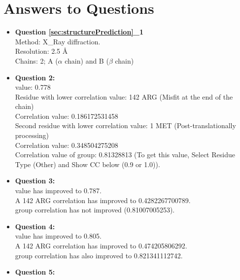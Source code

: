\section{Answers to Questions}
\label{app:solutions}

\begin{itemize}
 \item \textbf{Question \ref{sec:structurePrediction}\_1}\\
 
Method: X\_Ray diffraction.\\
Resolution: 2.5 \AA\\
Chains: 2; A ($\alpha$ chain) and B ($\beta$ chain)\\

 \item \textbf{Question 2:}\\
 
\ccmask value: 0.778\\
Residue with lower correlation value: 142 ARG (Misfit at the end of the chain)\\
Correlation value: 0.186172531458\\
Second residue with lower correlation value: 1 MET (Post-translationally processing)\\
Correlation value: 0.348504275208\\
Correlation value of  group: 0.81328813 (To get this value, Select Residue Type (Other) and Show CC below (0.9 or 1.0)).\\

 \item \textbf{Question 3:}\\
 
\ccmask value has improved to 0.787.\\
A 142 ARG correlation has improved to 0.4282267700789.\\
 group correlation has not improved (0.81007005253).\\

 \item \textbf{Question 4:}\\
 
 \ccmask value has improved to 0.805.\\
 A 142 ARG correlation has improved to 0.474205806292.\\
  group correlation has also improved to 0.821341112742.\\
 
 \item \textbf{Question 5:}\\
 

\end{itemize}
